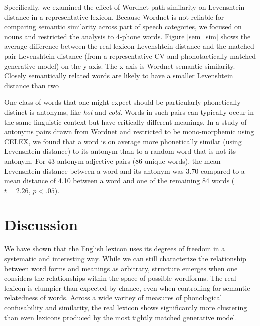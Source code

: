\documentclass{article}
\begin{document}
Specifically, we examined the effect of Wordnet path similarity on Levenshtein distance in a representative
lexicon. Because Wordnet is not reliable for comparing semantic similarity across part of speech categories,
we focused on nouns and restricted the analysis to 4-phone words. Figure \ref{sem_sim} shows the average
difference between the real lexicon Levenshtein distance and the matched pair Levenshtein distance (from a
representative CV and phonotactically matched generative model) on the y-axis. The x-axis is Wordnet semantic
similarity. Closely semantically related words are likely to have a smaller Levenshtein distance than two

One class of words that one might expect should be particularly phonetically distinct is antonyms, like
\textit{hot} and \textit{cold}. Words in such pairs can typically occur in the same linguistic context but
have critically different meanings. In a study of antonyms pairs drawn from Wordnet and restricted to be
mono-morphemic using CELEX, we found that a word is on average more phonetically similar (using Levenshtein
distance) to its antonym than to a random word that is not its antonym. For 43 antonym adjective pairs (86
unique words), the mean Levenshtein distance between a word and its antonym was 3.70 compared to a mean
distance of 4.10 between a word and one of the remaining 84 words ($t = 2.26$, $p < .05$).

\section{Discussion}

We have shown that the English lexicon uses its degrees of freedom in a systematic and interesting way. While
we can still characterize the relationship between word forms and meanings as arbitrary, structure emerges
when one considers the relationships within the space of possible wordforms. The real lexicon is clumpier than
expected by chance, even when controlling for semantic relatedness of words. Across a wide varitey of measures
of phonological confusability and similarity, the real lexicon shows significantly more clustering than even
lexicons produced by the most tightly matched generative model.
\end{document}
